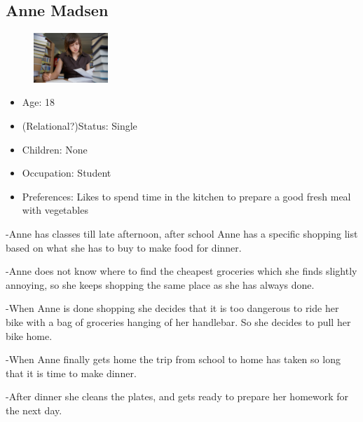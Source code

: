 \subsection{Anne Madsen}
\begin{figure}[H]
	\includegraphics[width=0.25\textwidth]{Grafik/FoodPlanner/PersonaAnneMadsen}
	\label{PersonaHenrikJensen}
\end{figure}
\begin{itemize}
	\item Age: 18
	\item (Relational?)Status: Single
	\item Children: None
	\item Occupation: Student
	\item Preferences: Likes to spend time in the kitchen to prepare a good fresh meal with vegetables
\end{itemize}
-Anne has classes till late afternoon, after school Anne has a specific shopping list based on what she has to buy to make food for dinner.

-Anne does not know where to find the cheapest groceries which she finds slightly annoying, so she keeps shopping the same place as she has always done.

-When Anne is done shopping she decides that it is too dangerous to ride her bike with a bag of groceries hanging of her handlebar. So she decides to pull her bike home.

-When Anne finally gets home the trip from school to home has taken so long that it is time to make dinner.

-After dinner she cleans the plates, and gets ready to prepare her homework for the next day. 
